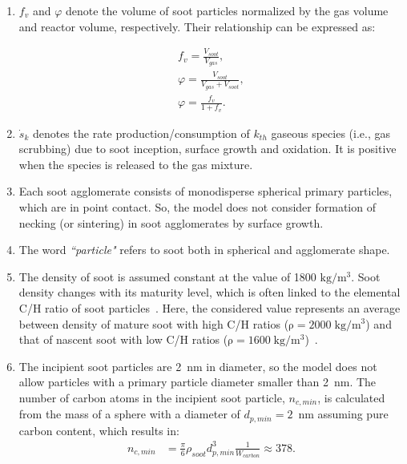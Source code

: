 \begin{enumerate}
	\item $f_v$ and $\varphi$ denote the volume of soot particles normalized by the gas volume and reactor volume, respectively. Their relationship can be expressed as:
	
	\begin{equation}
		\begin{split}
			f_v = \frac{V_{soot}}{V_{gas}}, \\
			\varphi = \frac{V_{soot}}{V_{gas} + V_{soot}}, \\
			\varphi = \frac{f_v}{1 + f_v}
			\label{eqn:fvdef}.
		\end{split}
	\end{equation}
	
	\item ${\dot{s}_k}$ denotes the rate production/consumption of $k_{th}$ gaseous species (i.e., gas scrubbing) due to soot inception, surface growth and oxidation. It is positive when the species is released to the gas mixture.
	
	\item Each soot agglomerate consists of monodisperse spherical primary particles, which are in point contact. So, the model does not consider formation of necking (or sintering) in soot agglomerates by surface growth.
	
	
	\item The word \textit{``particle"} refers to soot both in spherical and agglomerate shape. 
	
	\item The density of soot is assumed constant at the value of 1800 $\mathrm{kg/m^3}$. Soot density changes with its maturity level, which is often linked to the elemental C/H ratio of soot particles~\citep{michelsen2021effects}. Here, the considered value represents an average between density of mature soot with high C/H ratios ($\mathrm{\rho=2000\;kg/m^3}$) and that of nascent soot with low C/H ratios ($\mathrm{\rho=1600\;kg/m^3}$)~\citep{jensen2007measurement, michelsen2021effects}.
	
	\item The incipient soot particles are 2~nm in diameter, so the model does not allow particles with a primary particle diameter smaller than 2~nm. The number of carbon atoms in the incipient soot particle, $n_{c,min}$, is calculated from the mass of a sphere with a diameter of $d_{p,min}=2$~nm assuming pure carbon content, which results in:
	\begin{equation}
		\begin{split}
			n_{c,min}& =\frac{\pi}{6}\rho_{soot}d^3_{p,min}\frac{1}{W_{carbon}}\approx378.
			\label{eqn:nc_min}
		\end{split}
	\end{equation}
	

\end{enumerate}

